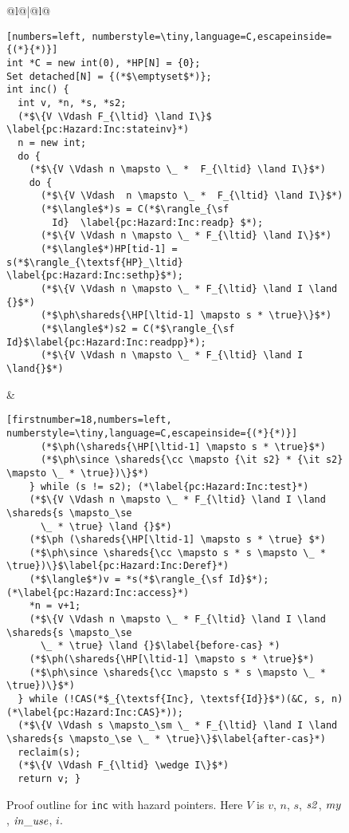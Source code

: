 \begin{figure}[t]
\begin{center}
\begin{tabular}{@{\hspace{-37pt}}l@{\quad}|@{\qquad}l@{}}
{\figfontsize
\begin{lstlisting}[numbers=left, numberstyle=\tiny,language=C,escapeinside={(*}{*)}]
int *C = new int(0), *HP[N] = {0}; 
Set detached[N] = {(*$\emptyset$*)};
int inc() {
  int v, *n, *s, *s2; 
  (*$\{V \Vdash F_{\ltid} \land I\}$ \label{pc:Hazard:Inc:stateinv}*) 
  n = new int; 
  do { 
    (*$\{V \Vdash n \mapsto \_ *  F_{\ltid} \land I\}$*)
    do { 
      (*$\{V \Vdash  n \mapsto \_ *  F_{\ltid} \land I\}$*)
      (*$\langle$*)s = C(*$\rangle_{\sf
        Id}  \label{pc:Hazard:Inc:readp} $*); 
      (*$\{V \Vdash n \mapsto \_ * F_{\ltid} \land I\}$*)  
      (*$\langle$*)HP[tid-1] = s(*$\rangle_{\textsf{HP}_\ltid} \label{pc:Hazard:Inc:sethp}$*); 
      (*$\{V \Vdash n \mapsto \_ * F_{\ltid} \land I \land {}$*)
      (*$\ph\shareds{\HP[\ltid-1] \mapsto s * \true}\}$*) 
      (*$\langle$*)s2 = C(*$\rangle_{\sf Id}$\label{pc:Hazard:Inc:readpp}*);
      (*$\{V \Vdash n \mapsto \_ * F_{\ltid} \land I \land{}$*)
\end{lstlisting}}
&
{\figfontsize
\begin{lstlisting}[firstnumber=18,numbers=left, numberstyle=\tiny,language=C,escapeinside={(*}{*)}]
      (*$\ph(\shareds{\HP[\ltid-1] \mapsto s * \true}$*)
      (*$\ph\since \shareds{\cc \mapsto {\it s2} * {\it s2} \mapsto \_ * \true})\}$*)
    } while (s != s2); (*\label{pc:Hazard:Inc:test}*)
    (*$\{V \Vdash n \mapsto \_ * F_{\ltid} \land I \land \shareds{s \mapsto_\se
      \_ * \true} \land {}$*)
    (*$\ph (\shareds{\HP[\ltid-1] \mapsto s * \true} $*)
    (*$\ph\since \shareds{\cc \mapsto s * s \mapsto \_ * \true})\}$\label{pc:Hazard:Inc:Deref}*)
    (*$\langle$*)v = *s(*$\rangle_{\sf Id}$*); (*\label{pc:Hazard:Inc:access}*)
    *n = v+1;
    (*$\{V \Vdash n \mapsto \_ * F_{\ltid} \land I \land \shareds{s \mapsto_\se
      \_ * \true} \land {}$\label{before-cas} *) 
    (*$\ph(\shareds{\HP[\ltid-1] \mapsto s * \true}$*)
    (*$\ph\since \shareds{\cc \mapsto s * s \mapsto \_ * \true})\}$*)
  } while (!CAS(*$_{\textsf{Inc}, \textsf{Id}}$*)(&C, s, n)(*\label{pc:Hazard:Inc:CAS}*));
  (*$\{V \Vdash s \mapsto_\sm \_ * F_{\ltid} \land I \land \shareds{s \mapsto_\se \_ * \true}\}$\label{after-cas}*)
  reclaim(s); 
  (*$\{V \Vdash F_{\ltid} \wedge I\}$*)   
  return v; }
\end{lstlisting}
}
\end{tabular}
\end{center}
\vspace{-7pt}
\caption{\label{fig:Hazard:Inc} \small Proof outline for {\tt inc} with hazard pointers.  Here $V$ is $v$, $n$, $s$, ${\it s2}$, ${\it my}$, ${\it in\_use}$, $i$.}
\end{figure}

